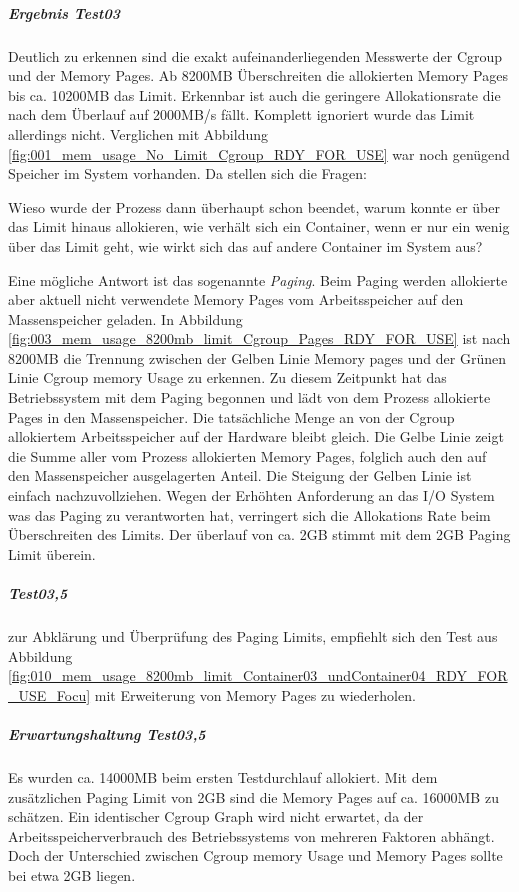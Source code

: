 \subparagraph{Ergebnis Test03}
Deutlich zu erkennen sind die exakt aufeinanderliegenden Messwerte der Cgroup und der Memory Pages. Ab 8200MB Überschreiten die allokierten Memory Pages bis ca. 10200MB das Limit. Erkennbar ist auch die geringere Allokationsrate die nach dem Überlauf auf 2000MB/s fällt. Komplett ignoriert wurde das Limit allerdings nicht. Verglichen mit Abbildung \ref{fig:001_mem_usage_No_Limit_Cgroup_RDY_FOR_USE} war noch genügend Speicher im System vorhanden. Da stellen sich die Fragen:

Wieso wurde der Prozess dann überhaupt schon beendet, warum konnte er über das Limit hinaus allokieren, wie verhält sich ein Container, wenn er nur ein wenig über das Limit geht, wie wirkt sich das auf andere Container im System aus?

Eine mögliche Antwort ist das sogenannte  \glqq{}\emph{Paging}\grqq{}. Beim Paging werden allokierte aber aktuell nicht verwendete Memory Pages vom Arbeitsspeicher auf den Massenspeicher geladen. In Abbildung \ref{fig:003_mem_usage_8200mb_limit_Cgroup_Pages_RDY_FOR_USE} ist nach 8200MB die Trennung zwischen der Gelben Linie \glqq{}Memory pages\grqq{} und der Grünen Linie \glqq{}Cgroup memory Usage\grqq{} zu erkennen. Zu diesem Zeitpunkt hat das Betriebssystem mit dem Paging begonnen und lädt von dem Prozess allokierte Pages in den Massenspeicher. Die tatsächliche Menge an von der Cgroup allokiertem Arbeitsspeicher auf der Hardware bleibt gleich. Die Gelbe Linie zeigt die Summe aller vom Prozess allokierten Memory Pages, folglich auch den auf den Massenspeicher ausgelagerten Anteil. Die Steigung der Gelben Linie ist einfach nachzuvollziehen. Wegen der Erhöhten Anforderung an das I/O System was das Paging zu verantworten hat, verringert sich die Allokations Rate beim Überschreiten des Limits. Der überlauf von ca. 2GB stimmt mit dem 2GB Paging Limit überein.

\subparagraph{Test03,5}
zur Abklärung und Überprüfung des Paging Limits, empfiehlt sich den Test aus Abbildung \ref{fig:010_mem_usage_8200mb_limit_Container03_undContainer04_RDY_FOR_USE_Focu} mit Erweiterung von Memory Pages zu wiederholen.

\subparagraph{Erwartungshaltung Test03,5}
Es wurden ca. 14000MB beim ersten Testdurchlauf allokiert. Mit dem zusätzlichen Paging Limit von 2GB sind die Memory Pages auf ca. 16000MB zu schätzen. Ein identischer Cgroup Graph wird nicht erwartet, da der Arbeitsspeicherverbrauch des Betriebssystems von mehreren Faktoren abhängt. Doch der Unterschied zwischen Cgroup memory Usage und Memory Pages sollte bei etwa 2GB liegen. 

